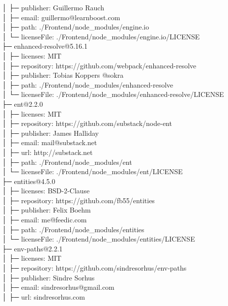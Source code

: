 \documentclass[
    paper=a4,
    twoside=false,
    parskip=half,
    listof=entryprefix,
    listof=totoc,
    index=totoc,
    bibliography=totoc,
    headsepline,
]{scrbook}
\begin{document}
    │  ├─ publisher: Guillermo Rauch\\
    │  ├─ email: guillermo@learnboost.com\\
    │  ├─ path: ./Frontend/node\_modules/engine.io\\
    │  └─ licenseFile: ./Frontend/node\_modules/engine.io/LICENSE\\
    ├─ enhanced-resolve@5.16.1\\
    │  ├─ licenses: MIT\\
    │  ├─ repository: https://github.com/webpack/enhanced-resolve\\
    │  ├─ publisher: Tobias Koppers @sokra\\
    │  ├─ path: ./Frontend/node\_modules/enhanced-resolve\\
    │  └─ licenseFile: ./Frontend/node\_modules/enhanced-resolve/LICENSE\\
    ├─ ent@2.2.0\\
    │  ├─ licenses: MIT\\
    │  ├─ repository: https://github.com/substack/node-ent\\
    │  ├─ publisher: James Halliday\\
    │  ├─ email: mail@substack.net\\
    │  ├─ url: http://substack.net\\
    │  ├─ path: ./Frontend/node\_modules/ent\\
    │  └─ licenseFile: ./Frontend/node\_modules/ent/LICENSE\\
    ├─ entities@4.5.0\\
    │  ├─ licenses: BSD-2-Clause\\
    │  ├─ repository: https://github.com/fb55/entities\\
    │  ├─ publisher: Felix Boehm\\
    │  ├─ email: me@feedic.com\\
    │  ├─ path: ./Frontend/node\_modules/entities\\
    │  └─ licenseFile: ./Frontend/node\_modules/entities/LICENSE\\
    ├─ env-paths@2.2.1\\
    │  ├─ licenses: MIT\\
    │  ├─ repository: https://github.com/sindresorhus/env-paths\\
    │  ├─ publisher: Sindre Sorhus\\
    │  ├─ email: sindresorhus@gmail.com\\
    │  ├─ url: sindresorhus.com\\
\end{document}

